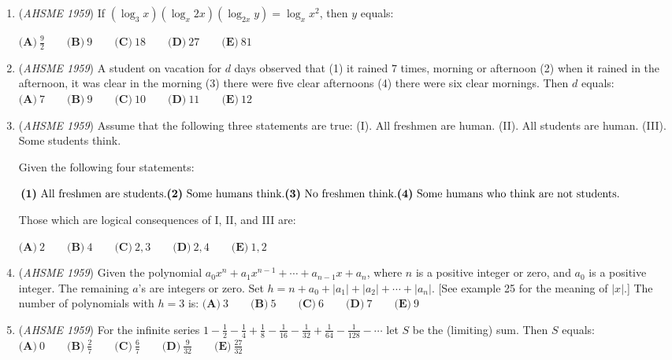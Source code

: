 \begin{enumerate}
	\item (\textit{AHSME 1959}) If $\left(\log_3 x\right)\left(\log_x 2x\right)\left( \log_{2x} y\right)=\log_{x}x^2$, then $y$ equals:


 $\textbf{(A)}\ \frac92\qquad\textbf{(B)}\ 9\qquad\textbf{(C)}\ 18\qquad\textbf{(D)}\ 27\qquad\textbf{(E)}\ 81$


	\item (\textit{AHSME 1959}) A student on vacation for $d$ days observed that (1) it rained $7$ times, morning or afternoon (2) when it rained in the afternoon, 
it was clear in the morning (3) there were five clear afternoons (4) there were six clear mornings. Then $d$ equals:
$\textbf{(A)}\ 7\qquad\textbf{(B)}\ 9\qquad\textbf{(C)}\ 10\qquad\textbf{(D)}\ 11\qquad\textbf{(E)}\ 12$


	\item (\textit{AHSME 1959}) Assume that the following three statements are true:
(I). All freshmen are human. (II). All students are human. (III). Some students think.


 Given the following four statements:


 $\textbf{(1)}\ \text{All freshmen are students.}\qquad \\ \textbf{(2)}\ \text{Some humans think.}\qquad \\ \textbf{(3)}\ \text{No freshmen think.}\qquad \\ \textbf{(4)}\ \text{Some humans who think are not students.}$


 Those which are logical consequences of I, II, and III are:


 $\textbf{(A)}\ 2\qquad\textbf{(B)}\ 4\qquad\textbf{(C)}\ 2,3\qquad\textbf{(D)}\ 2,4\qquad\textbf{(E)}\ 1,2$


	\item (\textit{AHSME 1959}) Given the polynomial $a_0x^n+a_1x^{n-1}+\cdots+a_{n-1}x+a_n$, where $n$ is a positive integer or zero, and $a_0$ is a positive integer. 
The remaining $a$'s are integers or zero. Set $h=n+a_0+|a_1|+|a_2|+\cdots+|a_n|$. [See example 25 for the meaning of $|x|$.] 
The number of polynomials with $h=3$ is:
$\textbf{(A)}\ 3\qquad\textbf{(B)}\ 5\qquad\textbf{(C)}\ 6\qquad\textbf{(D)}\ 7\qquad\textbf{(E)}\ 9$


	\item (\textit{AHSME 1959}) For the infinite series $1-\frac12-\frac14+\frac18-\frac{1}{16}-\frac{1}{32}+\frac{1}{64}-\frac{1}{128}-\cdots$ let $S$ be the (limiting) sum. Then $S$ equals:
$\textbf{(A)}\ 0\qquad\textbf{(B)}\ \frac27\qquad\textbf{(C)}\ \frac67\qquad\textbf{(D)}\ \frac{9}{32}\qquad\textbf{(E)}\ \frac{27}{32}$



\end{enumerate}
